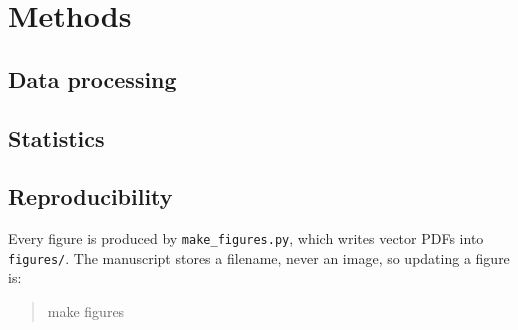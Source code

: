 \section{Methods}

\subsection*{Data processing}

\subsection*{Statistics}

\subsection*{Reproducibility}
Every figure is produced by \texttt{make\_figures.py}, which writes vector PDFs
into \texttt{figures/}. The manuscript stores a filename, never an image, so
updating a figure is:

\begin{quote}\ttfamily\small
make figures
\end{quote}

